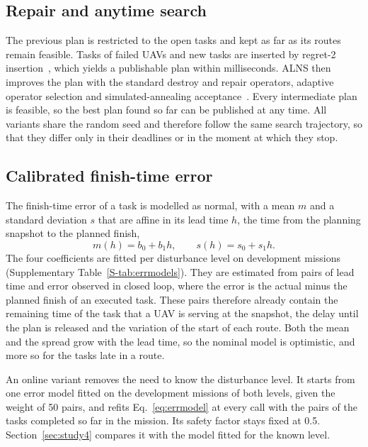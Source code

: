 \subsection{Repair and anytime search}
The previous plan is restricted to the open tasks and kept as far as its routes remain feasible. Tasks of failed UAVs
and new tasks are inserted by regret-2 insertion~\cite{ropke2006adaptive}, which yields a publishable plan within
milliseconds. ALNS then improves the plan with the standard destroy and repair operators, adaptive operator selection
and simulated-annealing acceptance~\cite{ropke2006adaptive,mara2022alns}. Every intermediate plan is feasible, so the
best plan found so far can be published at any time. All variants share the random seed and therefore follow the same
search trajectory, so that they differ only in their deadlines or in the moment at which they stop.

\subsection{Calibrated finish-time error}
The finish-time error of a task is modelled as normal, with a mean $m$ and a standard deviation $s$ that are affine in
its lead time $h$, the time from the planning snapshot to the planned finish,
\begin{equation}\label{eq:errmodel}
m(h)=b_0+b_1h,\qquad s(h)=s_0+s_1h .
\end{equation}
The four coefficients are fitted per disturbance level on development missions (Supplementary
Table~\ref{S-tab:errmodels}). They are estimated from pairs of lead time and error observed in closed loop, where the
error is the actual minus the planned finish of an executed task. These pairs therefore already contain the remaining
time of the task that a UAV is serving at the snapshot, the delay until the plan is released and the variation of the
start of each route. Both the mean and the spread grow with the lead time, so the nominal model is optimistic, and more
so for the tasks late in a route.

An online variant removes the need to know the disturbance level. It starts from one error model fitted on the
development missions of both levels, given the weight of 50 pairs, and refits Eq.~\eqref{eq:errmodel} at every call with
the pairs of the tasks completed so far in the mission. Its safety factor stays fixed at 0.5. Section~\ref{sec:study4}
compares it with the model fitted for the known level.


